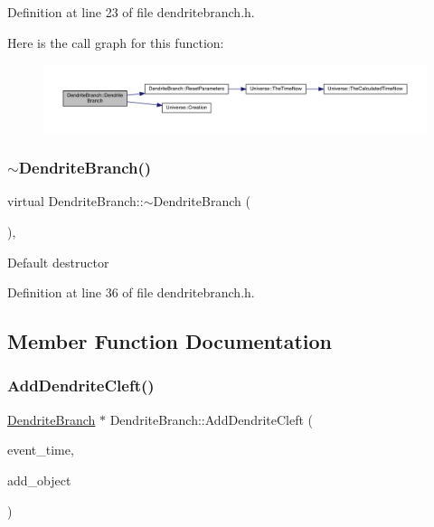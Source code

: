 Definition at line 23 of file dendritebranch.\+h.

Here is the call graph for this function\+:
\nopagebreak
\begin{figure}[H]
\begin{center}
\leavevmode
\includegraphics[width=350pt]{class_dendrite_branch_a9b7e932b0614dad370edd76f31900c40_cgraph}
\end{center}
\end{figure}
\mbox{\label{class_dendrite_branch_a38707cb6d1f9f07c6e8aa34a8a415051}} 
\subsubsection{\texorpdfstring{$\sim$\+Dendrite\+Branch()}{~DendriteBranch()}}
{\footnotesize\ttfamily virtual Dendrite\+Branch\+::$\sim$\+Dendrite\+Branch (\begin{DoxyParamCaption}{ }\end{DoxyParamCaption})\hspace{0.3cm}{\ttfamily [inline]}, {\ttfamily [virtual]}}

Default destructor 

Definition at line 36 of file dendritebranch.\+h.



\subsection{Member Function Documentation}
\mbox{\label{class_dendrite_branch_a060f0c55b2e6cb65b68e160df0bbf563}} 
\subsubsection{\texorpdfstring{Add\+Dendrite\+Cleft()}{AddDendriteCleft()}}
{\footnotesize\ttfamily \hyperlink{class_dendrite_branch}{Dendrite\+Branch} $\ast$ Dendrite\+Branch\+::\+Add\+Dendrite\+Cleft (\begin{DoxyParamCaption}\item[{std\+::chrono\+::time\+\_\+point$<$ \hyperlink{universe_8h_a0ef8d951d1ca5ab3cfaf7ab4c7a6fd80}{Clock} $>$}]{event\+\_\+time,  }\item[{\hyperlink{class_dendrite_branch}{Dendrite\+Branch} $\ast$}]{add\+\_\+object }\end{DoxyParamCaption})}



